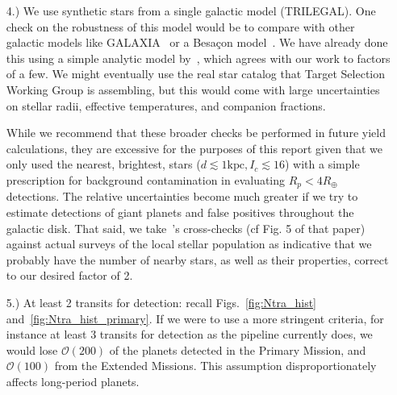 \begin{itemize}
	
	\item [4.) We use synthetic stars from a single galactic model (TRILEGAL).]
	One check on the robustness of this model would be to compare with other galactic models like GALAXIA~\citep{sharma_galaxia_2011} or a Besa\c con model~\citep{robin2003synthetic}.
	We have already done this using a simple analytic model by~\citet{winn_searchable_2013}, which agrees with our work to factors of a few.
	We might eventually use the real star catalog that \tesss Target Selection Working Group is assembling, but this would come with large uncertainties on stellar radii, effective temperatures, and companion fractions.
	
	While we recommend that these broader checks be performed in future \tess yield calculations, they are excessive for the purposes of this report given that we only used the nearest, brightest, stars ($d\lesssim\mathrm{1kpc}, I_c\lesssim16$) with a simple prescription for background contamination in evaluating \tesss $R_p<4R_\oplus$ detections.
	The relative uncertainties become much greater if we try to estimate detections of giant planets and false positives throughout the galactic disk.
	That said, we take~'s cross-checks (cf Fig. 5 of that paper) against actual surveys of the local stellar population as indicative that we probably have the number of nearby stars, as well as their properties, correct to our desired factor of 2.
	
	\item [5.) At least 2 transits for detection:] recall Figs.~\ref{fig:Ntra_hist} and~\ref{fig:Ntra_hist_primary}.
	If we were to use a more stringent criteria, for instance at least 3 transits for detection as the \kepler pipeline currently does, we would lose $\mathcal{O}(200)$ of the planets detected in the Primary Mission, and $\mathcal{O}(100)$ from the Extended Missions.
	This assumption disproportionately affects long-period planets.
	
	

\end{itemize}
